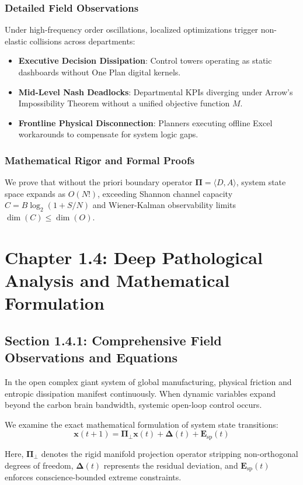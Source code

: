 \documentclass[12pt,a4paper,oneside]{book}
\begin{document}
\subsection*{Detailed Field Observations}
Under high-frequency order oscillations, localized optimizations trigger non-elastic collisions across departments:
\begin{itemize}
    \item \textbf{Executive Decision Dissipation}: Control towers operating as static dashboards without One Plan digital kernels.
    \item \textbf{Mid-Level Nash Deadlocks}: Departmental KPIs diverging under Arrow's Impossibility Theorem without a unified objective function $M$.
    \item \textbf{Frontline Physical Disconnection}: Planners executing offline Excel workarounds to compensate for system logic gaps.
\end{itemize}

\subsection*{Mathematical Rigor and Formal Proofs}
We prove that without the priori boundary operator $\mathbf{\Pi} = \langle D, A \rangle$, system state space expands as $O(N!)$, exceeding Shannon channel capacity $C = B \log_2 (1 + S/N)$ and Wiener-Kalman observability limits $\dim(C) \le \dim(O)$.
\clearpage
\chapter{Chapter 1.4: Deep Pathological Analysis and Mathematical Formulation}
\section{Section 1.4.1: Comprehensive Field Observations and Equations}

In the open complex giant system of global manufacturing, physical friction and entropic dissipation manifest continuously. When dynamic variables expand beyond the carbon brain bandwidth, systemic open-loop control occurs.

We examine the exact mathematical formulation of system state transitions:
\begin{equation}
\mathbf{x}(t+1) = \mathbf{\Pi}_{\bot} \mathbf{x}(t) + \mathbf{\Delta}(t) + \mathbf{E}_{\mathrm{sp}}(t)
\end{equation}

Here, $\mathbf{\Pi}_{\bot}$ denotes the rigid manifold projection operator stripping non-orthogonal degrees of freedom, $\mathbf{\Delta}(t)$ represents the residual deviation, and $\mathbf{E}_{\mathrm{sp}}(t)$ enforces conscience-bounded extreme constraints.
\end{document}
